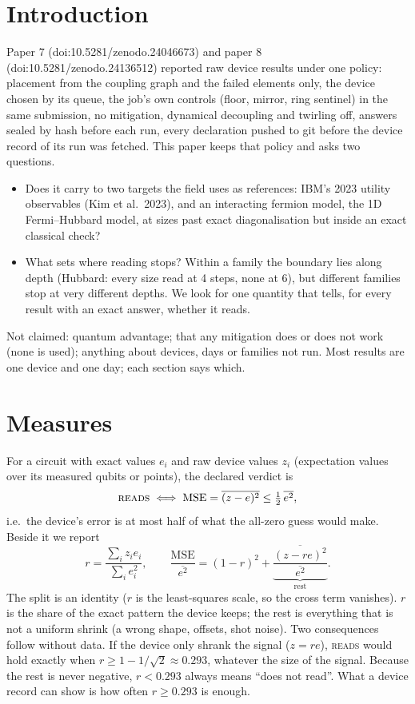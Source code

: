 \documentclass[10pt,a4paper]{article}
\begin{document}
\section{Introduction}\label{sec:intro}
Paper 7 (doi:10.5281/zenodo.24046673) and paper 8 (doi:10.5281/zenodo.24136512) reported raw device results under
one policy: placement from the coupling graph and the failed elements only, the device chosen by its queue, the job's
own controls (floor, mirror, ring sentinel) in the same submission, no mitigation, dynamical decoupling and twirling
off, answers sealed by hash before each run, every declaration pushed to git before the device record of its run was
fetched. This paper keeps that policy and asks two questions.
\begin{itemize}
\item Does it carry to two targets the field uses as references: IBM's 2023 utility observables (Kim et al.\ 2023), and
an interacting fermion model, the 1D Fermi--Hubbard model, at sizes past exact diagonalisation but inside an exact
classical check?
\item What sets where reading stops? Within a family the boundary lies along depth (Hubbard: every size read at 4
steps, none at 6), but different families stop at very different depths. We look for one quantity that tells, for
every result with an exact answer, whether it reads.
\end{itemize}
Not claimed: quantum advantage; that any mitigation does or does not work (none is used); anything about devices,
days or families not run. Most results are one device and one day; each section says which.

\section{Measures}\label{sec:measures}
For a circuit with exact values $e_i$ and raw device values $z_i$ (expectation values over its measured qubits or
points), the declared verdict is
\[ \textsc{reads} \iff \mathrm{MSE} = \overline{(z-e)^2} \le \tfrac12\,\overline{e^2}, \]
i.e.\ the device's error is at most half of what the all-zero guess would make. Beside it we report
\[ r = \frac{\sum_i z_i e_i}{\sum_i e_i^2}, \qquad
   \frac{\mathrm{MSE}}{\overline{e^2}} = (1 - r)^2 + \underbrace{\frac{\overline{(z - r e)^2}}{\overline{e^2}}}_{\text{rest}}. \]
The split is an identity ($r$ is the least-squares scale, so the cross term vanishes). $r$ is the share of the exact
pattern the device keeps; the rest is everything that is not a uniform shrink (a wrong shape, offsets, shot noise).
Two consequences follow without data. If the device only shrank the signal ($z = re$), \textsc{reads} would hold exactly
when $r \ge 1 - 1/\sqrt2 \approx 0.293$, whatever the size of the signal. Because the rest is never negative,
$r < 0.293$ always means ``does not read''. What a device record can show is how often $r \ge 0.293$ is enough.
\end{document}

